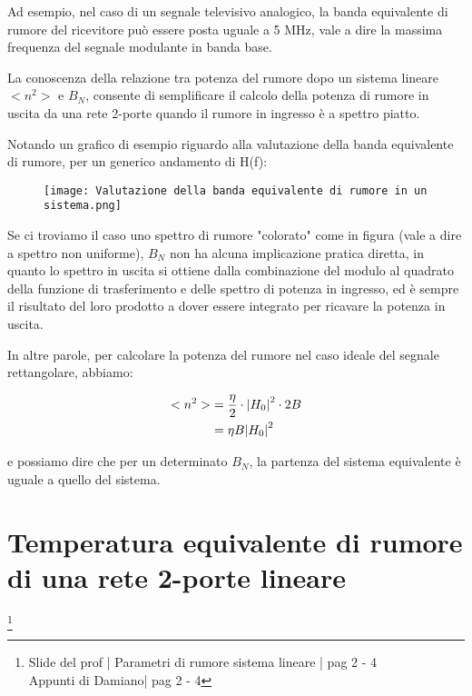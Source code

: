 Ad esempio, nel caso di un segnale televisivo analogico, la banda equivalente di rumore del ricevitore può essere posta uguale a 5 MHz, 
vale a dire la massima frequenza del segnale modulante in banda base. \newline 

La conoscenza della relazione tra potenza del rumore dopo un sistema lineare $<n^{2}>$ e $B_N$, 
consente di semplificare il calcolo della potenza di rumore in uscita da una rete 2-porte quando il rumore in ingresso è a spettro piatto. \newline 

Notando un grafico di esempio riguardo alla valutazione della banda equivalente di rumore, per un generico andamento di H(f): 

\begin{figure}[h]
    \centering
    \texttt{[image: Valutazione della banda equivalente di rumore in un sistema.png]}
\end{figure}

Se ci troviamo il caso uno spettro di rumore "colorato" come in figura (vale a dire a spettro non uniforme), 
$B_N$ non ha alcuna implicazione pratica diretta, in quanto lo spettro in uscita si ottiene dalla combinazione del modulo al quadrato della funzione di trasferimento e delle spettro di potenza in ingresso, 
ed è sempre il risultato del loro prodotto a dover essere integrato per ricavare la potenza in uscita. \newline 

In altre parole, per calcolare la potenza del rumore nel caso ideale del segnale rettangolare, abbiamo: 

{
    \Large 
    \begin{equation}
        \begin{split}
           <n^{2}>
           &=
           \frac{\eta}{2}
           \cdot
           \abs{H_0}^{2}
           \cdot
           2B 
           \\
           &=
           \eta B \abs{H_0}^2
        \end{split}
    \end{equation}
}

e possiamo dire che per un determinato $B_N$, 
la partenza del sistema equivalente è uguale a quello del sistema. \newline 

\newpage

\section{Temperatura equivalente di rumore di una rete 2-porte lineare}
\footnote{Slide del prof | Parametri di rumore sistema lineare | pag 2 - 4\\  
Appunti di Damiano| pag 2 - 4} 

